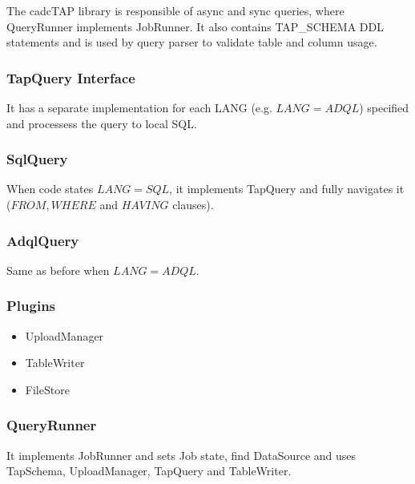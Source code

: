 The cadcTAP library is responsible of async and sync queries, where QueryRunner implements JobRunner. It also contains TAP\_SCHEMA DDL statements and is used by query parser to validate table and column usage.

\subsubsection{TapQuery Interface}

It has a separate implementation for each LANG (e.g. $LANG = ADQL$) specified and processess the query to local SQL.

\subsubsection{SqlQuery}

When code states $LANG=SQL$, it implements TapQuery and fully navigates it ($FROM, WHERE$ and $HAVING$ clauses).

\subsubsection{AdqlQuery}

Same as before when $LANG=ADQL$.

\subsubsection{Plugins}

\begin{itemize}
\item UploadManager
\item TableWriter
\item FileStore
\end{itemize}


\subsubsection{QueryRunner}

It implements JobRunner and sets Job state, find DataSource and uses TapSchema, UploadManager, TapQuery and TableWriter.

